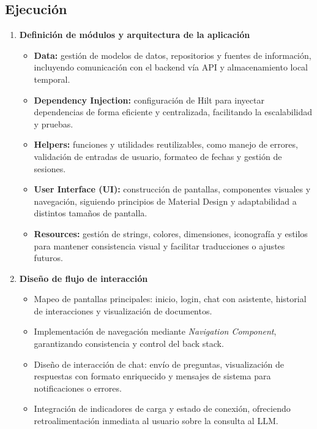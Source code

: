 \subsection{Ejecución}
\begin{enumerate}
      \item \textbf{Definición de módulos y arquitectura de la aplicación}
            \begin{itemize}
                  \item \textbf{Data:} gestión de modelos de datos, repositorios y fuentes de información, incluyendo comunicación con el backend vía API y almacenamiento local temporal.
                  \item \textbf{Dependency Injection:} configuración de Hilt para inyectar dependencias de forma eficiente y centralizada, facilitando la escalabilidad y pruebas.
                  \item \textbf{Helpers:} funciones y utilidades reutilizables, como manejo de errores, validación de entradas de usuario, formateo de fechas y gestión de sesiones.
                  \item \textbf{User Interface (UI):} construcción de pantallas, componentes visuales y navegación, siguiendo principios de Material Design y adaptabilidad a distintos tamaños de pantalla.
                  \item \textbf{Resources:} gestión de strings, colores, dimensiones, iconografía y estilos para mantener consistencia visual y facilitar traducciones o ajustes futuros.
            \end{itemize}

      \item \textbf{Diseño de flujo de interacción}
            \begin{itemize}
                  \item Mapeo de pantallas principales: inicio, login, chat con asistente, historial de
                        interacciones y visualización de documentos.
                  \item Implementación de navegación mediante \textit{Navigation Component},
                        garantizando consistencia y control del back stack.
                  \item Diseño de interacción de chat: envío de preguntas, visualización de respuestas
                        con formato enriquecido y mensajes de sistema para notificaciones o errores.
                  \item Integración de indicadores de carga y estado de conexión, ofreciendo
                        retroalimentación inmediata al usuario sobre la consulta al LLM.
            \end{itemize}


\end{enumerate}
